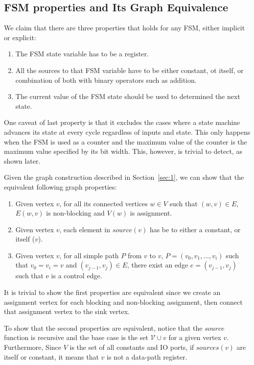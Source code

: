 \documentclass{article}
\begin{document}
\subsection{FSM properties and Its Graph Equivalence}
We claim that there are three properties that holds for any FSM, either implicit
or explicit:
\begin{enumerate}
    \item The FSM state variable has to be a register.
    \item\label{item:1} All the sources to that FSM variable have to be either constant, ot itself,
    or combination of both with binary operators such as addition.
    \item The current value of the FSM state should be used to determined the next
    state.
\end{enumerate}

One caveat of last property is that it excludes the cases where a state machine
advances its state at every cycle regardless of inputs and state. This only happens
when the FSM is used as a counter and the maximum value of the counter is the maximum
value specified by its bit width. This, however, is trivial to detect, as shown
later.

Given the graph construction described in Section~\ref{sec:1}, we can show that the
equivalent following graph properties:
\begin{enumerate}
    \item Given vertex $v$, for all its connected vertices $w \in V$ such that
    $(w, v) \in E$, $E(w, v)$ is non-blocking and $V(w)$ is assignment.
    \item Given vertex $v$, each element in $source(v)$ has be to either a constant,
    or itself ($v$).
    \item Given vertex $v$, for all simple path $P$ from $v$ to $v$,
    $P = (v_0, v_1, \dots, v_i)$ such that $v_0 = v_i = v$ and $(v_{j-1}, v_{j}) \in E$,
    there exist an edge $e = (v_{j-1}, v_j)$ such that e is a control edge.
\end{enumerate}

It is trivial to show the first properties are equivalent since we create an assignment
vertex for each blocking and non-blocking assignment, then connect that assignment vertex
to the sink vertex.

To show that the second properties are equivalent, notice that the $source$ function
is recursive and the base case is the set $\mathcal{V} \cup v$ for a given vertex
$v$. Furthermore, Since $V$ is the set of all constants and IO ports, if $sources(v)$ are itself
or constant, it means that $v$ is not a data-path register.
\end{document}

